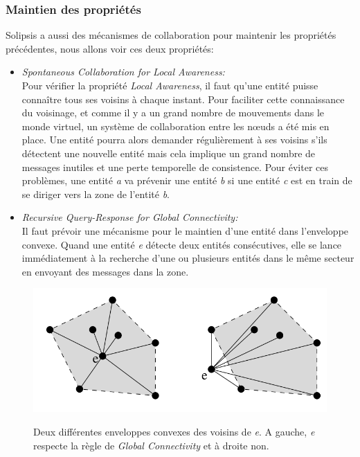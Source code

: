 		\subsubsection{Maintien des propriétés}
Solipsis a aussi des mécanismes de collaboration pour maintenir les propriétés précédentes, nous allons voir ces deux propriétés:
	\begin{itemize}
	\renewcommand{\labelitemi}{$\bullet$}
		\item \textit{Spontaneous Collaboration for Local Awareness:}\\
		 Pour vérifier la propriété \textit{Local Awareness}, il faut qu'une entité puisse connaître tous ses voisins à chaque instant. Pour faciliter cette connaissance du voisinage, et comme il y a un grand nombre de mouvements dans le monde virtuel, un système de collaboration entre les nœuds a été mis en place. Une entité pourra alors demander régulièrement à ses voisins s'ils détectent une nouvelle entité mais cela implique un grand nombre de messages inutiles et une perte temporelle de consistence. Pour éviter ces problèmes, une entité \textit{a} va prévenir une entité \textit{b} si une entité \textit{c} est en train de se diriger vers la zone de l'entité \textit{b}.
		\item \textit{Recursive Query-Response for Global Connectivity:}\\
		Il faut prévoir une mécanisme pour le maintien d'une entité dans l'enveloppe convexe. Quand une entité \textit{e} détecte deux entités consécutives, elle se lance immédiatement à la recherche d'une ou plusieurs entités dans le même secteur en envoyant des messages dans la zone. \\ 
	\end{itemize}
        \vspace{1cm}
        \begin{figure}[!h]
	\centering
        \includegraphics[scale=0.9]{./Ressources/Images/envelop_convex1.png}\\
        \caption{Deux différentes enveloppes convexes des voisins de \textit{e}. A gauche, \textit{e} respecte la règle de \textit{Global Connectivity} et à droite non.}
        \label{Envelop_Convex}
        \end{figure}
